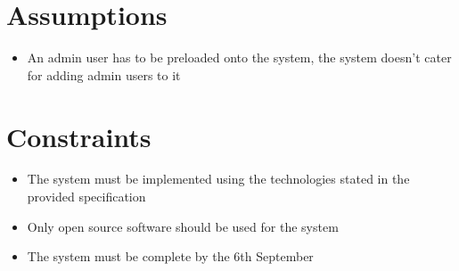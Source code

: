 \documentclass[a4paper,10pt]{article}
\begin{document}
\section{Assumptions}
\begin{itemize}
	\item An admin user has to be preloaded onto the system, the system doesn’t cater for adding admin users to it
\end{itemize}

\section{Constraints}
\begin{itemize}
	\item The system must be implemented using the technologies stated in the provided specification
	\item Only open source software should be used for the system
	\item The system must be complete by the 6th September
\end{itemize}




\newpage
\clearpage
\end{document}
